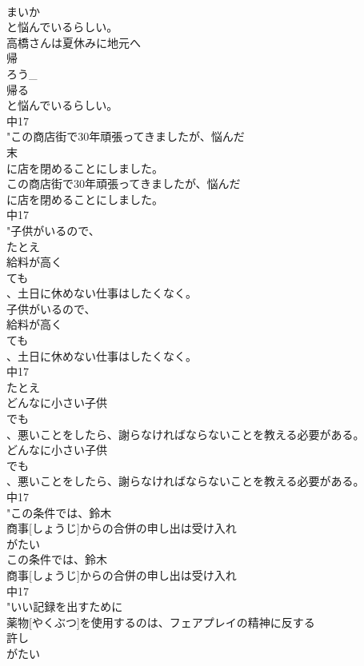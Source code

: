 \documentclass[8pt]{extreport}
\begin{document}
\begin{CJK}{UTF8}{min}
\\	まいか
\\	と悩んでいるらしい。
\\	高橋さんは夏休みに地元へ
\\	帰
\\	ろう_
\\	帰る
\\	と悩んでいるらしい。
\\	中17
\\	"この商店街で30年頑張ってきましたが、悩んだ
\\	末
\\	に店を閉めることにしました。
\\	この商店街で30年頑張ってきましたが、悩んだ
\\	に店を閉めることにしました。
\\	中17
\\	"子供がいるので、
\\	たとえ
\\	給料が高く
\\	ても
\\	、土日に休めない仕事はしたくなく。
\\	子供がいるので、
\\	給料が高く
\\	ても
\\	、土日に休めない仕事はしたくなく。
\\	中17
\\	たとえ
\\	どんなに小さい子供
\\	でも
\\	、悪いことをしたら、謝らなければならないことを教える必要がある。
\\	どんなに小さい子供
\\	でも
\\	、悪いことをしたら、謝らなければならないことを教える必要がある。
\\	中17
\\	"この条件では、鈴木
\\	商事[しょうじ]からの合併の申し出は受け入れ
\\	がたい
\\	この条件では、鈴木
\\	商事[しょうじ]からの合併の申し出は受け入れ
\\	中17
\\	"いい記録を出すために
\\	薬物[やくぶつ]を使用するのは、フェアプレイの精神に反する
\\	許し
\\	がたい

\end{CJK}
\end{document}
